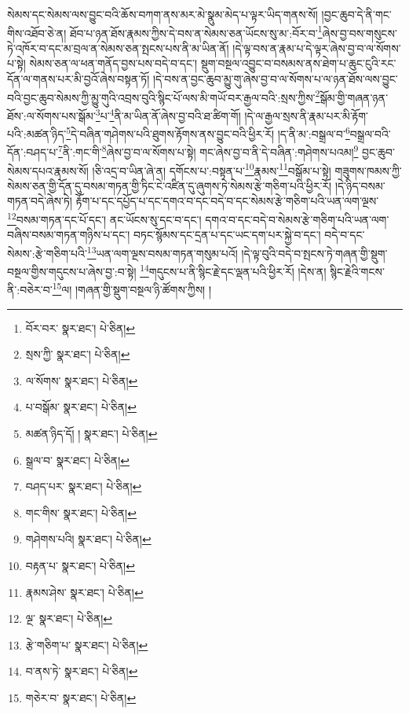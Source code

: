 སེམས་དང་སེམས་ལས་བྱུང་བའི་ཆོས་བཀག་ནས་མར་མེ་སྣུམ་མེད་པ་ལྟར་ཡིད་གནས་སོ། །བྱང་ཆུབ་དེ་ནི་གང་གིས་འཐོབ་ཅེ་ན། ཐོབ་པ་ཉན་ཐོས་རྣམས་ཀྱིས་དེ་བས་ན་སེམས་ཅན་ཡོངས་སུ་མ་:བོར་བ་\footnote{བོར་བར་  སྣར་ཐང་།  པེ་ཅིན། }ཞེས་བྱ་བས་གསུངས་ཏེ་འཁོར་བ་དང་མ་བྲལ་ན་སེམས་ཅན་སྤངས་པས་ནི་མ་ཡིན་ནོ། །དེ་ལྟ་བས་ན་རྣམ་པ་དེ་ལྟར་ཞེས་བྱ་བ་ལ་སོགས་པ་སྟེ། སེམས་ཅན་ལ་ཕན་གནོད་བྱས་པས་བདེ་བ་དང་། སྡུག་བསྔལ་འབྱུང་བ་བསམས་ནས་ཐེག་པ་ཆུང་ངུའི་རང་དོན་ལ་གནས་པར་མི་བྱའོ་ཞེས་བསྟན་ཏོ། །དེ་བས་ན་བྱང་ཆུབ་མྱུ་གུ་ཞེས་བྱ་བ་ལ་སོགས་པ་ལ་ཉན་ཐོས་ལས་བྱུང་བའི་བྱང་ཆུབ་སེམས་ཀྱི་མྱུ་གུའི་འབྲས་བུའི་སྙིང་པོ་ལས་མི་གཡོ་བར་རྒྱལ་བའི་:སྲས་ཀྱིས་\footnote{སྲས་ཀྱི་  སྣར་ཐང་།  པེ་ཅིན། }སྒོམ་གྱི་གཞན་ཉན་ཐོས་:ལ་སོགས་པས་སྒོམ་\footnote{ལ་སོགས་  སྣར་ཐང་།  པེ་ཅིན། }པ་\footnote{པ་བསྒོམ་  སྣར་ཐང་།  པེ་ཅིན། }ནི་མ་ཡིན་ནོ་ཞེས་བྱ་བའི་ཐ་ཚིག་གོ། །དེ་ལ་རྒྱལ་སྲས་ནི་རྣམ་པར་མི་རྟོག་པའི་:མཚན་ཉིད་\footnote{མཚན་ཉིད་དོ། །  སྣར་ཐང་།  པེ་ཅིན། }དེ་བཞིན་གཤེགས་པའི་ཐུགས་རྟོགས་ནས་བྱུང་བའི་ཕྱིར་རོ། །ད་ནི་མ་:བསྒྲལ་བ་\footnote{སྒྲལ་བ་  སྣར་ཐང་།  པེ་ཅིན། }བསྒྲལ་བའི་དོན་:བཤད་པ་\footnote{བཤད་པར་  སྣར་ཐང་།  པེ་ཅིན། }ནི་:གང་གི་\footnote{གང་གིས་  སྣར་ཐང་།  པེ་ཅིན། }ཞེས་བྱ་བ་ལ་སོགས་པ་སྟེ། གང་ཞེས་བྱ་བ་ནི་དེ་བཞིན་:གཤེགས་པའམ།\footnote{གཤེགས་པའི།  སྣར་ཐང་།  པེ་ཅིན། } བྱང་ཆུབ་སེམས་དཔའ་རྣམས་སོ། །ཅི་འདྲ་བ་ཡིན་ཞེ་ན། དགོངས་པ་:བསྟན་པ་\footnote{བརྟན་པ་  སྣར་ཐང་།  པེ་ཅིན། }རྣམས་\footnote{རྣམས་ཤེས་  སྣར་ཐང་།  པེ་ཅིན། }བསྒོམ་པ་སྟེ། གཟུགས་ཁམས་ཀྱི་སེམས་ཅན་གྱི་དོན་དུ་བསམ་གཏན་གྱི་ཏིང་ངེ་འཛིན་དུ་ཞུགས་ཏེ་སེམས་རྩེ་གཅིག་པའི་ཕྱིར་རོ། །དེ་ཉིད་བསམ་གཏན་བདེ་ཞེས་ཏེ། རྟོག་པ་དང་དཔྱོད་པ་དང་དགའ་བ་དང་བདེ་བ་དང་སེམས་རྩེ་གཅིག་པའི་ཡན་ལག་ལྔས་\footnote{ལྔ་  སྣར་ཐང་།  པེ་ཅིན། }བསམ་གཏན་དང་པོ་དང་། ནང་ཡོངས་སུ་དང་བ་དང་། དགའ་བ་དང་བདེ་བ་སེམས་རྩེ་གཅིག་པའི་ཡན་ལག་བཞིས་བསམ་གཏན་གཉིས་པ་དང་། བཏང་སྙོམས་དང་དྲན་པ་དང་ཡང་དག་པར་སྐྱེ་བ་དང་། བདེ་བ་དང་སེམས་:རྩེ་གཅིག་པའི་\footnote{རྩེ་གཅིག་པ་  སྣར་ཐང་།  པེ་ཅིན། }ཡན་ལག་ལྔས་བསམ་གཏན་གསུམ་པའོ། །དེ་ལྟ་བུའི་བདེ་བ་སྤངས་ཏེ་གཞན་གྱི་སྡུག་བསྔལ་གྱིས་གདུངས་པ་ཞེས་བྱ་:བ་སྟེ། \footnote{བ་ནས་ཏེ་  སྣར་ཐང་།  པེ་ཅིན། }གདུངས་པ་ནི་སྙིང་རྗེ་དང་ལྡན་པའི་ཕྱིར་རོ། །དེས་ན། སྙིང་རྗེའི་གངས་ནི་:བཅེར་བ་\footnote{གཅེར་བ་  སྣར་ཐང་།  པེ་ཅིན། }ལ། །གཞན་གྱི་སྡུག་བསྔལ་ཉི་ཚོགས་ཀྱིས། །
